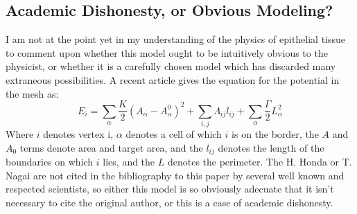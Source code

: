 \subsection{Academic Dishonesty, or Obvious Modeling?}

I am not at the point yet in my understanding of the physics of epithelial tissue to comment upon whether this model ought to be intuitively obvious to the physicist, or whether it is a carefully chosen model which has discarded many extraneous possibilities. A recent article \cite{Julicher Cheats} gives the equation for the potential in the mesh as:
\begin{equation}
E_i = \sum\limits_{\alpha}\frac K2(A_\alpha - A_\alpha^0)^2 + \sum\limits_{i,j}\Lambda_{ij}l_{ij} + \sum\limits_{\alpha}\frac\Gamma2L_\alpha^2
\end{equation}
 Where $i$ denotes vertex i, $\alpha$ denotes a cell of which $i$ is on the border, the $A$ and $A_0$ terms denote area and target area, and the $l_{ij}$ denotes the length of the boundaries on which $i$ lies, and the $L$ denotes the perimeter. The H. Honda or T. Nagai are not cited in the bibliography to this paper by several well known and respected scientists, so either this model is so obviously adecuate that it isn't necessary to cite the original author, or this is a case of academic dishonesty.

